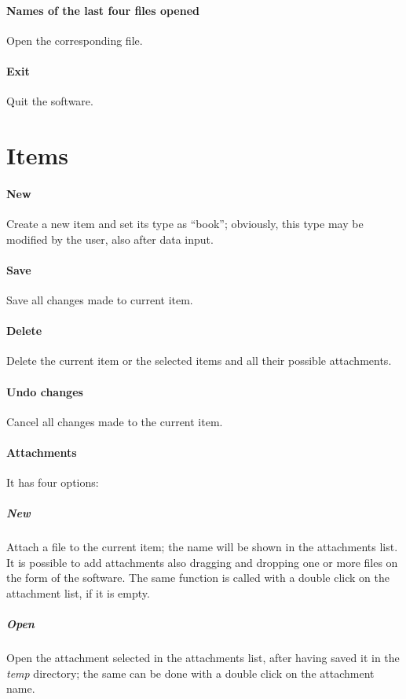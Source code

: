 \documentclass[a4paper,12pt]{report}
\begin{document}
\paragraph{Names of the last four files opened} Open the corresponding file.

\paragraph{Exit} Quit the software.

\section{Items}

\paragraph{New} Create a new item and set its type as “book”; obviously, this type may be modified by the user, also after data input.

\paragraph{Save} Save all changes made to current item.

\paragraph{Delete} Delete the current item or the selected items and all their possible attachments.

\paragraph{Undo changes} Cancel all changes made to the current item.

\paragraph{Attachments} It has four options:

\subparagraph{New} Attach a file to the current item; the name will be shown in the attachments list. It is possible to add attachments also dragging and dropping one or more files on the form of the software. The same function is called with a double click on the attachment list, if it is empty.

\subparagraph{Open} Open the attachment selected in the attachments list, after having saved it in the \textit{temp} directory; the same can be done with a double click on the attachment name.
\end{document}
